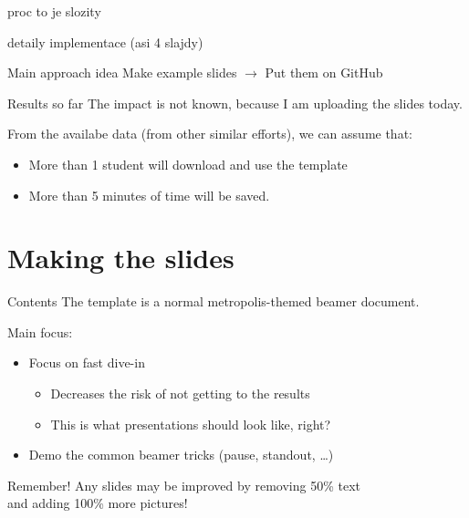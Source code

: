 \documentclass[aspectratio=169]{beamer}
\begin{document}
\begin{frame}{proc to je slozity}
\end{frame}

\begin{frame}{detaily implementace (asi 4 slajdy)}
\end{frame}

\begin{frame}[standout]{Main approach idea}
Make example slides
$\to$
Put them on GitHub
\end{frame}

\begin{frame}{Results so far}
The impact is not known, because I am uploading the slides today.

\pause
From the availabe data (from other similar efforts), we can assume that:
\begin{itemize}
\item \alert<2>{More than 1 student will download and use the template}
\item \alert<3>{More than 5 minutes of time will be saved.} 
\end{itemize}
\end{frame}

\section{Making the slides}

\begin{frame}{Contents}
The template is a normal metropolis-themed beamer document.

Main focus:
\begin{itemize}
\item Focus on fast dive-in \pause
  \begin{itemize}
  \item Decreases the risk of not getting to the results
  \item This is what presentations should look like, right? \pause
  \end{itemize}
\item Demo the common beamer tricks (pause, standout, \dots)
\end{itemize}
\end{frame}

\begin{frame}[standout]{Remember!}
Any slides may be improved by removing 50\% text \\ and adding 100\% more pictures!
\end{frame}
\end{document}
